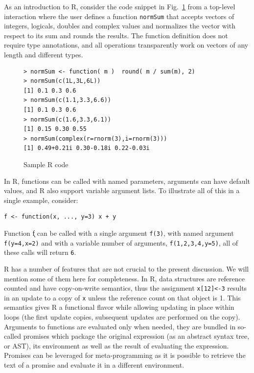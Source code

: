 \documentclass[acmsmall,review,anonymous]{acmart}\settopmatter{printfolios=true,printccs=false,printacmref=false}
\newcommand{\code}[1]{{\lstinline[style=Rin]!#1!}\xspace}
\begin{document}
As an introduction to R, consider the code snippet in Fig.~\ref{sample} from
a top-level interaction where the user defines a function \code{normSum}
that accepts vectors of integers, logicals, doubles and complex values and
normalizes the vector with respect to its sum and rounds the results. The
function definition does not require type annotations, and all operations
transparently work on vectors of any length and different types.

\begin{figure}[!hb]{\begin{lstlisting}
> normSum <- function( m )  round( m / sum(m), 2)
> normSum(c(1L,3L,6L))
[1] 0.1 0.3 0.6
> normSum(c(1.1,3.3,6.6))
[1] 0.1 0.3 0.6
> normSum(c(1.6,3.3,6.1))
[1] 0.15 0.30 0.55
> normSum(complex(r=rnorm(3),i=rnorm(3)))
[1] 0.49+0.21i 0.30-0.18i 0.22-0.03i
\end{lstlisting}}
\caption{Sample R code}\label{sample}
\end{figure}

In R, functions can be called with named parameters, arguments can have
default values, and R also support variable argument lists.  To illustrate
all of this in a single example, consider:

\begin{lstlisting}
f <- function(x, ..., y=3) x + y
\end{lstlisting}

\noindent
Function \k{f} can be called with a single argument \code{f(3)}, with named
argument \code{f(y=4,x=2)} and with a variable number of arguments,
\code{f(1,2,3,4,y=5)}, all of these calls will return \code{6}.

R has a number of features that are not crucial to the present
discussion. We will mention some of them here for completeness.  In R, data
structures are reference counted and have copy-on-write semantics, thus the
assignment \code{x[12]<-3} results in an update to a copy of \code{x} unless
the reference count on that object is 1.  This semantics gives R a
functional flavor while allowing updating in place within loops (the first
update copies, subsequent updates are performed on the copy). Arguments to
functions are evaluated only when needed, they are bundled in so-called
promises which package the original expression (as an abstract syntax tree, or AST), its environment
as well as the result of evaluating the expression. Promises can be
leveraged for meta-programming as it is possible to retrieve the text of a
promise and evaluate it in a different environment.
\end{document}

